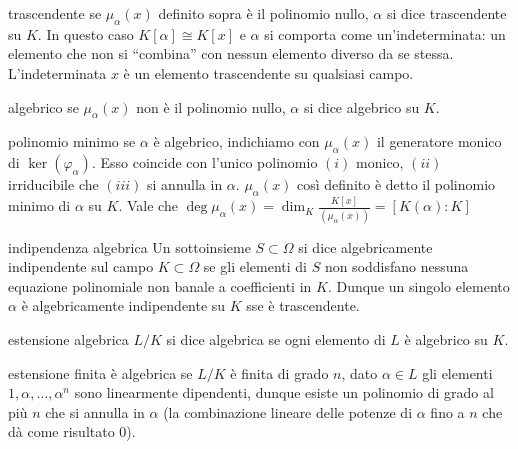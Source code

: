\begin{definition}{trascendente}
    se $\mu_{\alpha}(x)$ definito sopra è il polinomio nullo, $\alpha$ si dice trascendente su $K$.
    In questo caso $K[\alpha] \cong K[x]$ e $\alpha$ si comporta come un'indeterminata: un elemento che non si ``combina'' con nessun elemento diverso da se stessa.
    L'indeterminata $x$ è un elemento trascendente su qualsiasi campo.
\end{definition}
\begin{definition}{algebrico}
    se $\mu_{\alpha}(x)$ non è il polinomio nullo, $\alpha$ si dice algebrico su $K$.
\end{definition}
\begin{definition}{polinomio minimo}
    se $\alpha$ è algebrico, indichiamo con $\mu_{\alpha}(x)$ il generatore monico di $\ker(\varphi_\alpha)$. Esso coincide con l'unico polinomio $(i)$ monico, $(ii)$ irriducibile che $(iii)$ si annulla in $\alpha$.
    $\mu_{\alpha}(x)$ così definito è detto il polinomio minimo di $\alpha$ su $K$. Vale che $\deg \mu_\alpha(x) = \dim_K \frac{K[x]}{(\mu_{\alpha}(x))} = [K(\alpha) : K]$
\end{definition}
\begin{definition}{indipendenza algebrica}
    Un sottoinsieme $S \subset \Omega$ si dice algebricamente indipendente sul campo $K \subset \Omega$ se gli elementi di $S$ non soddisfano nessuna equazione polinomiale non banale a coefficienti in $K$. Dunque un singolo elemento $\alpha$ è algebricamente indipendente su $K$ sse è trascendente.
\end{definition}
\begin{definition}{estensione algebrica}
    $L/K$ si dice algebrica se ogni elemento di $L$ è algebrico su $K$.
\end{definition}
\begin{proposition}{estensione finita è algebrica}
    se $L/K$ è finita di grado $n$, dato $\alpha \in L$ gli elementi $1,\alpha,\dots,\alpha^n$ sono linearmente dipendenti, dunque esiste un polinomio di grado al più $n$ che si annulla in $\alpha$ (la combinazione lineare delle potenze di $\alpha$ fino a $n$ che dà come risultato $0$).
\end{proposition}


